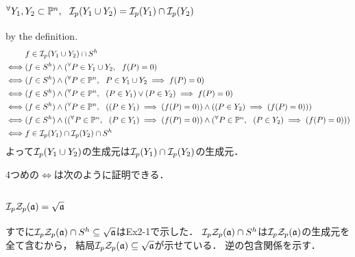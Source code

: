 \documentclass[a4paper]{jsarticle}
\begin{document}
    \subsection{$\Forall{Y_1, Y_2 \subset \proj^n} \defsp(Y_1 \cup Y_2)=\defsp(Y_1) \cap \defsp(Y_2)$}
    by the definition.
    \begin{align*}
        {}&     f \in \defsp(Y_1 \cup Y_2) \cap S^h \\
        \iff&   (f \in S^h) \land (\Forall{P \in Y_1 \cup Y_2} f(P)=0) \\
        \iff&   (f \in S^h) \land (\Forall{P \in \proj^n} P \in Y_1 \cup Y_2 \implies f(P)=0) \\
        \iff&   (f \in S^h) \land (\Forall{P \in \proj^n} (P \in Y_1)  \lor (P \in Y_2) \implies f(P)=0) \\
        \iff&   (f \in S^h) \land (\Forall{P \in \proj^n} ((P \in Y_1) \implies (f(P)=0)) \land ((P \in Y_2) \implies (f(P)=0)))  \\
        \iff&   (f \in S^h) \land ((\Forall{P \in \proj^n} (P \in Y_1) \implies (f(P)=0)) \land (\Forall{P \in \proj^n} (P \in Y_2) \implies (f(P)=0)))  \\
        \iff&   f \in \defsp(Y_1) \cap \defsp(Y_2) \cap S^h
    \end{align*}
    よって$\defsp(Y_1 \cup Y_2)$の生成元は$\defsp(Y_1) \cap \defsp(Y_2)$の生成元．

    4つめの$\iff$は次のように証明できる．
    \begin{prooftree}
    \end{prooftree}

    \subsection{$\defsp \zerosp(\I{a})=\sqrt{\I{a}}$}
    すでに$\defsp \zerosp(\I{a}) \cap S^h \subseteq \sqrt{\I{a}}$はEx2-1で示した．
    $\defsp \zerosp(\I{a}) \cap S^h$は$\defsp \zerosp(\I{a})$の生成元を全て含むから，
    結局$\defsp \zerosp(\I{a}) \subseteq \sqrt{\I{a}}$が示せている．
    逆の包含関係を示す．
\end{document}
